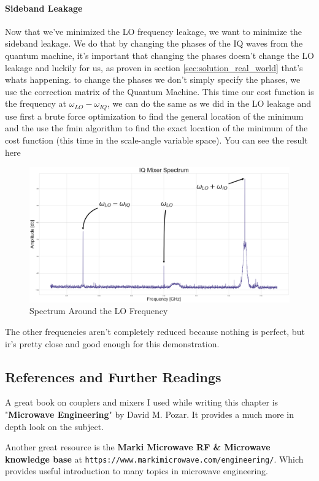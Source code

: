 \paragraph{Sideband Leakage}
Now that we've minimized the LO frequency leakage, we want to minimize the sideband leakage. We do that by changing the phases of the IQ waves from the quantum machine, it's important that changing the phases doesn't change the LO leakage and luckily for us, as proven in section \ref{sec:solution_real_world} that's whats happening. to change the phases we don't simply specify the phases, we use the correction matrix of the Quantum Machine.
This time our cost function is the frequency at $\omega_{LO} - \omega_{IQ}$, we can do the same as we did in the LO leakage and use first a brute force optimization to find the general location of the minimum and the use the fmin algorithm to find the exact location of the minimum of the cost function (this time in the scale-angle variable space). You can see the result here
\begin{figure}[H]
    \centering
    \includegraphics[width=0.9\columnwidth]{Important-Spectrum-all-correction2.png} 
    \caption{Spectrum Around the LO Frequency}
    \label{fig:closeup-spectrum-no-corrections}
\end{figure}
The other frequencies aren't completely reduced because nothing is perfect, but ir's pretty close and good enough for this demonstration.

\subsection{References and Further Readings}
A great book on couplers and mixers I used while writing this chapter is "\textbf{Microwave Engineering}" by David M. Pozar. It provides a much more in depth look on the subject.

Another great resource is the \textbf{Marki Microwave RF \& Microwave knowledge base} at \newline \texttt{https://www.markimicrowave.com/engineering/}. Which provides useful introduction to many topics in microwave engineering.